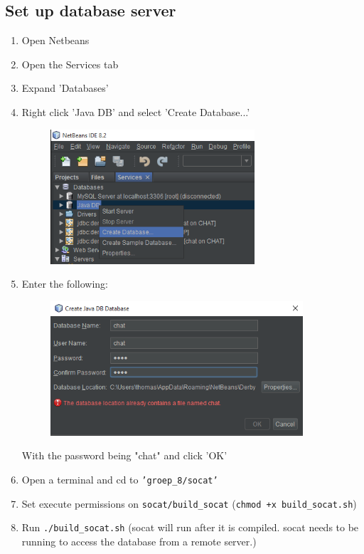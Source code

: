 \documentclass[11pt]{article}
\begin{document}
\subsection{Set up database server}
\begin{enumerate}
	\item Open Netbeans
	\item Open the Services tab
	\item Expand 'Databases'
	\item Right click 'Java DB' and select 'Create Database...'
	\begin{figure}[H]
		\centering
		\includegraphics[height=50mm]{select_create_db.png}
	\end{figure}
	\item Enter the following:
	\begin{figure}[H]
		\centering
		\includegraphics[height=50mm]{select_create_db2.png}
	\end{figure}
	With the password being "chat" and click 'OK'

	\item Open a terminal and cd to \texttt{'groep\_8/socat'}
	\item Set execute permissions on \texttt{socat/build\_socat} (\texttt{chmod +x build\_socat.sh})
	\item Run \texttt{./build\_socat.sh} (socat will run after it is compiled. socat needs to be running to access the database from a remote server.)
\end{enumerate}
\end{document}
